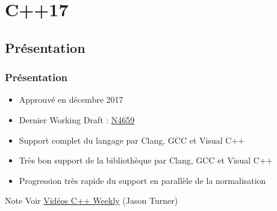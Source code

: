 \documentclass[C++.tex]{subfiles}
\begin{document}
\section{C++17}
\subsection*{Présentation}
\begin{frame}
	\frametitle{Présentation}
	\begin{itemize}
		\item Approuvé en décembre 2017
		\item Dernier Working Draft : \href{http://www.open-std.org/jtc1/sc22/wg21/docs/papers/2017/n4659.pdf}{N4659}
		\item Support complet du langage par Clang, GCC et Visual C++
		\item Très bon support de la bibliothèque par Clang, GCC et Visual C++


		\item Progression très rapide du support en parallèle de la normalisation
	\end{itemize}

	\begin{block}{Note}
		Voir \href{https://www.youtube.com/user/lefticus1/videos}{Vidéos C++ Weekly} (Jason Turner)
	\end{block}
\end{frame}
\end{document}
